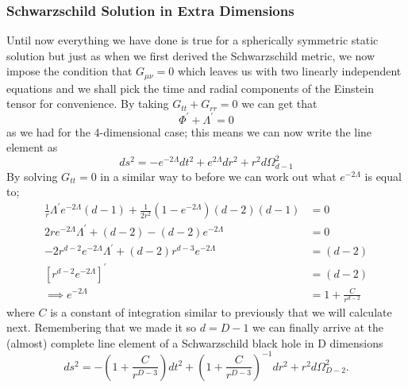 \documentclass[12pt]{article}
\numberwithin{equation}{section}
\numberwithin{figure}{section}
\begin{document}
\subsubsection{Schwarzschild Solution in Extra Dimensions} %
\label{sub:schwarzschild_solution_in_extra_dimensions}
Until now everything we have done is true for a spherically symmetric static solution but just as when we first derived the Schwarzschild metric, we now impose the condition that $G_{\mu\nu} =0$ which leaves us with two linearly independent equations and we shall pick the time and radial components of the Einstein tensor for convenience. By taking $G_{tt}+G_{rr}=0$ we can get that
\begin{equation}
	\Phi ^{\prime} +\Lambda ^{\prime} =0
\end{equation}
as we had for the 4-dimensional case; this means we can now write the line element as 
\begin{equation}
	ds^2 =-e^{-2\Lambda}dt^2 + e^{2\Lambda}dr^2 + r^2 d{\Omega}^2_{d-1}
\end{equation}
By solving $G_{tt}=0$ in a similar way to before we can work out what $e^{-2\Lambda}$ is equal to;
\begin{align}
	\frac{1}{r} \Lambda ^{\prime} e^{-2\Lambda}(d-1) + \frac{1}{2r^{2}}(1-e^{-2\Lambda})(d-2)(d-1)&=0\\
	2re^{-2\Lambda}\Lambda ^{\prime} +(d-2) -(d-2)e^{-2\Lambda}&=0\\
	-2r^{d-2}e^{-2\Lambda}\Lambda ^{\prime} +(d-2)r^{d-3}e^{-2\Lambda} &= (d-2)\\
	\left[r^{d-2}e^{-2\Lambda}\right]^{\prime} &=(d-2)\\
	\implies e^{-2\Lambda}&=1 + \frac{C}{r^{d-2}}
\end{align}
where $C$ is a constant of integration similar to previously that we will calculate next. Remembering that we made it so $d=D-1$ we can finally arrive at the (almost) complete line element of a Schwarzschild black hole in D dimensions
\begin{equation}
	ds^2 =-\left(1+\frac{C}{r^{D-3}}\right)dt^2 + \left(1+\frac{C}{r^{D-3}}\right)^{-1}dr^2 + r^2 d{\Omega}^2_{D-2}.
\end{equation}
\end{document}
